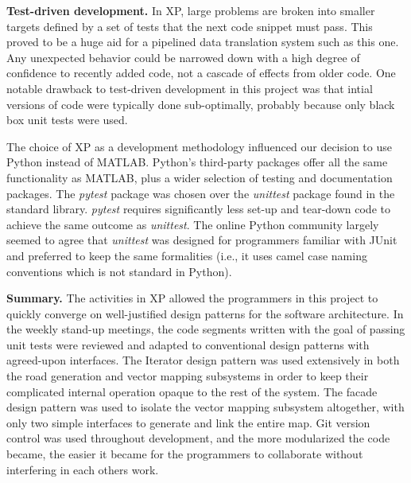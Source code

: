 \documentclass[12pt,twoside]{article}
\begin{document}
\textbf{Test-driven development.}
In XP, large problems are broken into smaller targets defined by a set of tests that the next code snippet must pass. This proved to be a huge aid for a pipelined data translation system such as this one. Any unexpected behavior could be narrowed down with a high degree of confidence to recently added code, not a cascade of effects from older code. One notable drawback to test-driven development in this project was that intial versions of code were typically done sub-optimally, probably because only black box unit tests were used.

The choice of XP as a development methodology influenced our decision to use Python instead of MATLAB. Python's third-party packages offer all the same functionality as MATLAB, plus a wider selection of testing and documentation packages. The \textit{pytest} package was chosen over the \textit{unittest} package found in the standard library. \textit{pytest} requires significantly less set-up and tear-down code to achieve the same outcome as \textit{unittest}. The online Python community largely seemed to agree that \textit{unittest} was designed for programmers familiar with JUnit and preferred to keep the same formalities (i.e., it uses camel case naming conventions which is not standard in Python).

\textbf{Summary.}
The activities in XP allowed the programmers in this project to quickly converge on well-justified design patterns for the software architecture. In the weekly stand-up meetings, the code segments written with the goal of passing unit tests were reviewed and adapted to conventional design patterns with agreed-upon interfaces. The Iterator design pattern was used extensively in both the road generation and vector mapping subsystems in order to keep their complicated internal operation opaque to the rest of the system. The facade design pattern was used to isolate the vector mapping subsystem altogether, with only two simple interfaces to generate and link the entire map. Git version control was used throughout development, and the more modularized the code became, the easier it became for the programmers to collaborate without interfering in each others work.
\end{document}
